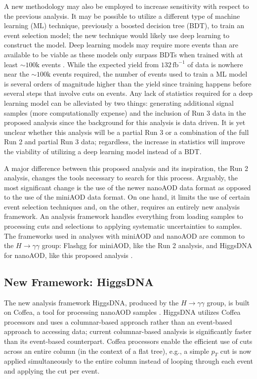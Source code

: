 \documentclass[12pt]{article}
\begin{document}
A new methodology may also be employed to increase sensitivity with respect to the previous analysis. It may be possible to utilize a different type of machine learning (ML) technique, previously a boosted decision tree (BDT), to train an event selection model; the new technique would likely use deep learning to construct the model. Deep learning models may require more events than are available to be viable as these models only surpass BDTs when trained with at least ${\sim} 100\mathrm{k}$ events \cite{DNN_May}. While the expected yield from $132\, \mathrm{fb}^{-1}$ of data is nowhere near the ${\sim} 100\mathrm{k}$ events required, the number of events used to train a ML model is several orders of magnitude higher than the yield since training happens before several steps that involve cuts on events. Any lack of statistics required for a deep learning model can be alleviated by two things: generating additional signal samples (more computationally expense) and the inclusion of Run 3 data in the proposed analysis since the background for this analysis is data driven. It is yet unclear whether this analysis will be a partial Run 3 or a combination of the full Run 2 and partial Run 3 data; regardless, the increase in statistics will improve the viability of utilizing a deep learning model instead of a BDT.\par

A major difference between this proposed analysis and its inspiration, the Run 2 analysis, changes the tools necessary to search for this process. Arguably, the most significant change is the use of the newer nanoAOD data format as opposed to the use of the miniAOD data format. On one hand, it limits the use of certain event selection techniques and, on the other, requires an entirely new analysis framework. An analysis framework handles everything from loading samples to processing cuts and selections to applying systematic uncertainties to samples. The frameworks used in analyses with miniAOD and nanoAOD are common to the $H\rightarrow\gamma\gamma$ group: Flashgg for miniAOD, like the Run 2 analysis, and HiggsDNA for nanoAOD, like this proposed analysis \cite{Flashgg, HiggsDNA}.\par

\subsection{New Framework: HiggsDNA}
The new analysis framework HiggsDNA, produced by the $H \rightarrow \gamma\gamma$ group, is built on Coffea, a tool for processing nanoAOD samples \cite{lindsey_gray_2023_8408347}. HiggsDNA utilizes Coffea processors and uses a columnar-based approach rather than an event-based approach to accessing data; current columnar-based analysis is significantly faster than its event-based counterpart. Coffea processors enable the efficient use of cuts across an entire column (in the context of a flat tree), e.g., a simple $p_T$ cut is now applied simultaneously to the entire column instead of looping through each event and applying the cut per event.\par
\end{document}
